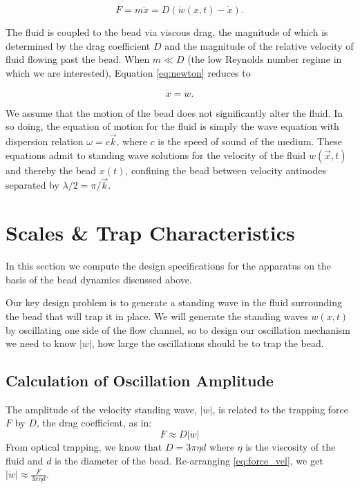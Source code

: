 \begin{equation}
F = m \ddot{x} = D\left(\dot{w}\left(x,t\right)-\dot{x}\right)\label{eq:newton}.
\end{equation}

The fluid is coupled to the bead via viscous drag, the magnitude of which is determined by the drag coefficient $D$ and the magnitude of the relative velocity of fluid flowing past the bead.   When $m \ll D$ (the low Reynolds number regime in which we are interested), Equation \ref{eq:newton} reduces to

\begin{equation}
\dot{x} = \dot{w}.
\end{equation}

We assume that the motion of the bead does not significantly alter the fluid.  In so doing, the equation of motion for the fluid is simply the wave equation with dispersion relation $\omega = c \vec{k}$, where $c$ is the speed of sound of the medium.  These equations admit to standing wave solutions for the velocity of the fluid $w\left(\vec{x},t\right)$ and thereby the bead $x\left(t\right)$, confining the bead between velocity antinodes separated by $\lambda/2 = \pi/\vec{k}$.

\section{Scales \& Trap Characteristics}

In this section we compute the design specifications for the apparatus on the basis of the bead dynamics discussed above.

Our key design problem is to generate a standing wave in the fluid surrounding the bead that will trap it in place. We will generate the standing waves $w(x,t)$ by oscillating one side of the flow channel, so to design our oscillation mechanism we need to know $|w|$, how large the oscillations should be to trap the bead.

\subsection{Calculation of Oscillation Amplitude}

The amplitude of the velocity standing wave, $|\dot{w}|$, is related to the trapping force $F$ by $D$, the drag coefficient, as in:
\begin{equation} \label{eq:force_vel}
F \approx D |\dot{w}|
\end{equation}
From optical trapping, we know that $D = 3 \pi \eta d$ where $\eta$ is the viscosity of the fluid and $d$ is the diameter of the bead. Re-arranging \ref{eq:force_vel}, we get $|\dot{w}| \approx \frac{F}{3 \pi \eta d}$. 

